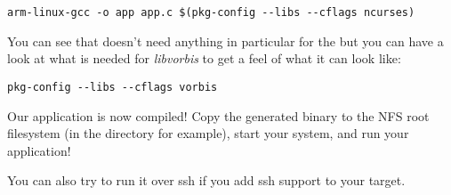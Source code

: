 \begin{verbatim}
arm-linux-gcc -o app app.c $(pkg-config --libs --cflags ncurses)
\end{verbatim}

You can see that  doesn't need anything in particular for the
 but you can have a look at what is needed for
{\em libvorbis} to get a feel of what it can look like:

\begin{verbatim}
pkg-config --libs --cflags vorbis
\end{verbatim}

Our application is now compiled! Copy the generated binary to the NFS
root filesystem (in the  directory for example), start
your system, and run your application!

You can also try to run it over ssh if you add ssh support to your
target.

